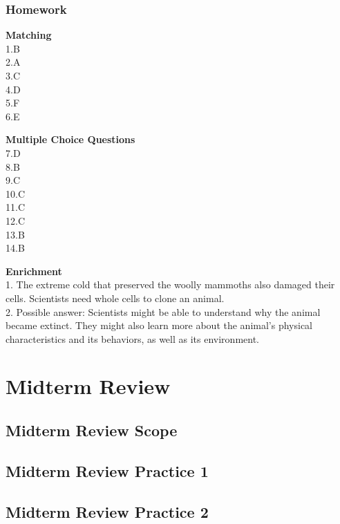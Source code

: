 \documentclass[
]{book}
\begin{document}
\hypertarget{homework-4}{%
\subsection{Homework}\label{homework-4}}

\textbf{Matching}\\
1.B\\
2.A\\
3.C\\
4.D\\
5.F\\
6.E

\textbf{Multiple Choice Questions}\\
7.D\\
8.B\\
9.C\\
10.C\\
11.C\\
12.C\\
13.B\\
14.B

\textbf{Enrichment}\\
1. The extreme cold that preserved the woolly mammoths also damaged their cells.
Scientists need whole cells to clone an animal.\\
2. Possible answer: Scientists might be able to understand why the animal became
extinct. They might also learn more about the animal's physical characteristics and its behaviors, as well as its environment.

\hypertarget{midterm-review}{%
\chapter{Midterm Review}\label{midterm-review}}

\hypertarget{midterm-review-scope}{%
\section{Midterm Review Scope}\label{midterm-review-scope}}

\hypertarget{midterm-review-practice-1}{%
\section{Midterm Review Practice 1}\label{midterm-review-practice-1}}

\hypertarget{midterm-review-practice-2}{%
\section{Midterm Review Practice 2}\label{midterm-review-practice-2}}
\end{document}
